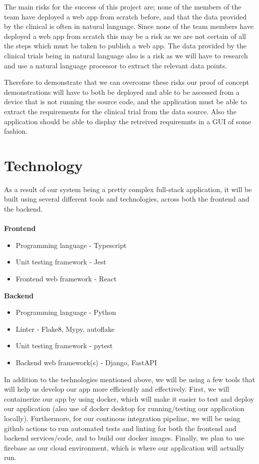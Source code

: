 \documentclass{article}
\begin{document}
The main risks for the success of this project are; none of the members of the team have deployed a web app from scratch before, and that the data provided by the clinical is often in natural language. Since none of the team members have deployed a web app from scratch this may be a risk as we are not certain of all the steps which must be taken to publish a web app. The data provided by the clinical trials being in natural language also is a risk as we will have to research and use a natural language processor to extract the relevant data points. 

Therefore to demonstrate that we can overcome these risks our proof of concept demonstrations will have to both be deployed and able to be ascessed from a device that is not running the source code, and the application must be able to extract the requirements for the clinical trial from the data source. Also the application should be able to display the retreived requiremnts in a GUI of some fashion.

\section{Technology}

As a result of our system being a pretty complex full-stack application, it will be built
using several different tools and technologies, across both the frontend and the backend.
\\~\\
\textbf{Frontend}

\begin{itemize}
	\item Programming language - Typescript
	\item Unit testing framework - Jest
	\item Frontend web framework - React\\
\end{itemize}

\textbf{Backend}

\begin{itemize}
	\item Programming language - Python
	\item Linter - Flake8, Mypy, autoflake
	\item Unit testing framework - pytest
	\item Backend web framework(s) - Django, FastAPI\\
\end{itemize}

In addition to the technologies mentioned above, we will be using a few tools that will help us 
develop our app more efficiently and effectively. First, we will containerize our app
by using docker, which will make it easier to test and deploy our application (also use of docker desktop for running/testing
our application locally). Furthermore, for our continous 
integration pipeline, we will be using github actions to run automated tests and linting for both the frontend and backend 
services/code, and to build our docker images. Finally, we plan to use firebase as our cloud environment, which
is where our application will actually run. \\
\end{document}
